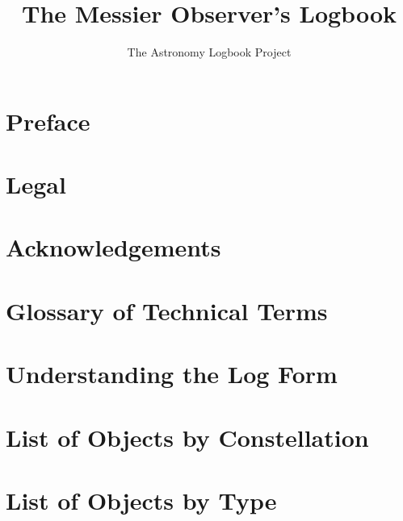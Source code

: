 \documentclass[a4paper]{book}
\begin{document}
\author{The Astronomy Logbook Project}
\title{\Huge The Messier Observer's Logbook}
\maketitle

\frontmatter
\tableofcontents

\chapter*{Preface}



\chapter{Legal}



\chapter{Acknowledgements}



\mainmatter

\chapter{Glossary of Technical Terms}



\chapter{Understanding the Log Form}



\twocolumn
\chapter{List of Objects by Constellation}



\chapter{List of Objects by Type}



\end{document}
